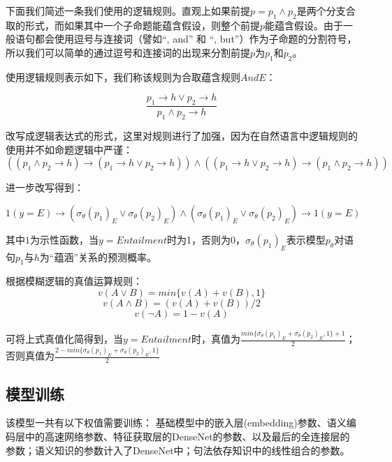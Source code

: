 \documentclass[UTF8,11pt,a4paper,nofonts]{ctexart}
\begin{document}
下面我们简述一条我们使用的逻辑规则。直观上如果前提$p=p_1 \land p_2$是两个分支合取的形式，而如果其中一个子命题能蕴含假设，则整个前提$p$能蕴含假设。由于一般语句都会使用逗号与连接词（譬如“, and” 和 “, but”）作为子命题的分割符号，所以我们可以简单的通过逗号和连接词的出现来分割前提$p$为$p_1$和$p_2$。

使用逻辑规则表示如下，我们称该规则为合取蕴含规则$AndE$：

\begin{equation}
\frac{p_1 \to h \vee p_2 \to h}{p_1 \land p_2 \to h}
\end{equation}


改写成逻辑表达式的形式，这里对规则进行了加强，因为在自然语言中逻辑规则的使用并不如命题逻辑中严谨：
\begin{equation}
 ((p_1 \land p_2 \to h) \to (p_1 \to h \vee p_2 \to h)) \land ((p_1 \to h \vee p_2 \to h) \to (p_1 \land p_2 \to h))
\end{equation}

进一步改写得到：

\begin{equation}
1(y=E) \to (\sigma_\theta(p_1)_E \vee \sigma_\theta(p_2)_E) \land (\sigma_\theta(p_1)_E \vee \sigma_\theta(p_2)_E) \to 1(y=E)
\end{equation}

其中$1$为示性函数，当$y=Entailment$时为1，否则为0，$\sigma_\theta(p_1)_E$表示模型$p_\theta$对语句$p_1$与$h$为“蕴涵”关系的预测概率。

根据模糊逻辑的真值运算规则：
\begin{equation}
v(A \vee B) = min\{v(A)+v(B),1\}
\end{equation}
\begin{equation}
v(A \land B) = (v(A) + v(B)) / 2
\end{equation}
\begin{equation}
v(\neg A) = 1 - v(A)
\end{equation}

可将上式真值化简得到，当$y=Entailment$时，真值为$\frac{min\{\sigma_\theta(p_1)_E+\sigma_\theta(p_2)_E,1\}+1}{2}$；否则真值为$\frac{2-min\{\sigma_\theta(p_1)_E+\sigma_\theta(p_2)_E,1\}}{2}$

\subsection{模型训练}


该模型一共有以下权值需要训练：
基础模型中的嵌入层(embedding)参数、语义编码层中的高速网络参数、特征获取层的DenseNet的参数、以及最后的全连接层的参数；语义知识的参数计入了DenseNet中；句法依存知识中的线性组合的参数。
\end{document}

